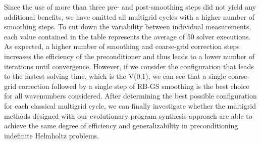 Since the use of more than three pre- and post-smoothing steps did not yield any additional benefits, we have omitted all multigrid cycles with a higher number of smoothing steps.
To cut down the variability between individual measurements, each value contained in the table represents the average of 50 solver executions.
As expected, a higher number of smoothing and coarse-grid correction steps increases the efficiency of the preconditioner and thus leads to a lower number of iterations until convergence.
However, if we consider the configuration that leads to the fastest solving time, which is the V(0,1), we can see that a single coarse-grid correction followed by a single step of RB-GS smoothing is the best choice for all wavenumbers considered.
After determining the best possible configuration for each classical multigrid cycle, we can finally investigate whether the multigrid methods designed with our evolutionary program synthesis approach are able to achieve the same degree of efficiency and generalizability in preconditioning indefinite Helmholtz problems.

